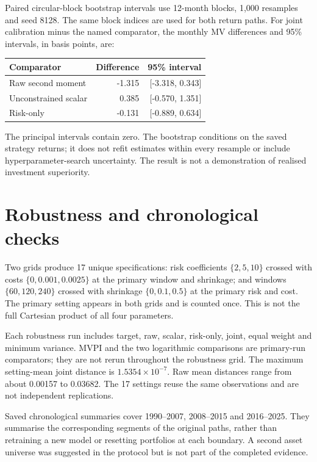 \documentclass[11pt,a4paper]{article}
\begin{document}
Paired circular-block bootstrap intervals use 12-month blocks, 1,000 resamples and seed 8128. The same block indices are used for both return paths. For joint calibration minus the named comparator, the monthly MV differences and 95\% intervals, in basis points, are:
\begin{center}\begin{tabular}{lrr}\toprule Comparator & Difference & 95\% interval\\\midrule
Raw second moment & -1.315 & [-3.318, 0.343] \\
Unconstrained scalar & 0.385 & [-0.570, 1.351] \\
Risk-only & -0.131 & [-0.889, 0.634] \\
\bottomrule\end{tabular}\end{center}
The principal intervals contain zero. The bootstrap conditions on the saved strategy returns; it does not refit estimates within every resample or include hyperparameter-search uncertainty. The result is not a demonstration of realised investment superiority.

\section{Robustness and chronological checks}
Two grids produce 17 unique specifications: risk coefficients $\{2,5,10\}$ crossed with costs $\{0,0.001,0.0025\}$ at the primary window and shrinkage; and windows $\{60,120,240\}$ crossed with shrinkage $\{0,0.1,0.5\}$ at the primary risk and cost. The primary setting appears in both grids and is counted once. This is not the full Cartesian product of all four parameters.

Each robustness run includes target, raw, scalar, risk-only, joint, equal weight and minimum variance. MVPI and the two logarithmic comparisons are primary-run comparators; they are not rerun throughout the robustness grid. The maximum setting-mean joint distance is $1.5354\times10^{-7}$. Raw mean distances range from about 0.00157 to 0.03682. The 17 settings reuse the same observations and are not independent replications.

Saved chronological summaries cover 1990--2007, 2008--2015 and 2016--2025. They summarise the corresponding segments of the original paths, rather than retraining a new model or resetting portfolios at each boundary. A second asset universe was suggested in the protocol but is not part of the completed evidence.
\end{document}
